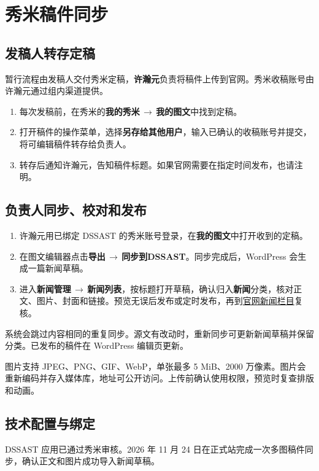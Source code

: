 \documentclass[UTF8,a4paper,zihao=-4,fontset=fandol]{ctexart}
\newcommand{\menu}[2]{\textbf{#1}\,\ensuremath{\rightarrow}\,\textbf{#2}}
\begin{document}
\section{秀米稿件同步}

\subsection{发稿人转存定稿}
暂行流程由发稿人交付秀米定稿，\textbf{许瀚元}负责将稿件上传到官网。秀米收稿账号由许瀚元通过组内渠道提供。

\begin{enumerate}
  \item 每次发稿前，在秀米的\menu{我的秀米}{我的图文}中找到定稿。
  \item 打开稿件的操作菜单，选择\textbf{另存给其他用户}，输入已确认的收稿账号并提交，将可编辑稿件转存给负责人。
  \item 转存后通知许瀚元，告知稿件标题。如果官网需要在指定时间发布，也请注明。
\end{enumerate}

\subsection{负责人同步、校对和发布}
\begin{enumerate}
  \item 许瀚元用已绑定 DSSAST 的秀米账号登录，在\textbf{我的图文}中打开收到的定稿。
  \item 在图文编辑器点击\menu{导出}{同步到DSSAST}。同步完成后，WordPress 会生成一篇新闻草稿。
  \item 进入\menu{新闻管理}{新闻列表}，按标题打开草稿，确认归入\textbf{新闻}分类，核对正文、图片、封面和链接。预览无误后发布或定时发布，再到\href{https://dssast.cn/news/}{官网新闻栏目}复核。
\end{enumerate}

系统会跳过内容相同的重复同步。源文有改动时，重新同步可更新新闻草稿并保留分类。已发布的稿件在 WordPress 编辑页更新。

图片支持 JPEG、PNG、GIF、WebP，单张最多 5 MiB、2000 万像素。图片会重新编码并存入媒体库，地址可公开访问。上传前确认使用权限，预览时复查排版和动画。

\subsection{技术配置与绑定}
DSSAST 应用已通过秀米审核。2026 年 11 月 24 日在正式站完成一次多图稿件同步，确认正文和图片成功导入新闻草稿。
\end{document}
